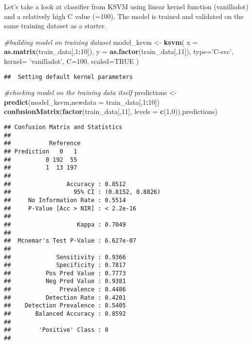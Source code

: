 \documentclass[
]{article}
\newenvironment{Shaded}{\begin{snugshade}}{\end{snugshade}}
\newcommand{\CommentTok}[1]{\textcolor[rgb]{0.56,0.35,0.01}{\textit{#1}}}
\newcommand{\DataTypeTok}[1]{\textcolor[rgb]{0.13,0.29,0.53}{#1}}
\newcommand{\DecValTok}[1]{\textcolor[rgb]{0.00,0.00,0.81}{#1}}
\newcommand{\KeywordTok}[1]{\textcolor[rgb]{0.13,0.29,0.53}{\textbf{#1}}}
\newcommand{\NormalTok}[1]{#1}
\newcommand{\OperatorTok}[1]{\textcolor[rgb]{0.81,0.36,0.00}{\textbf{#1}}}
\newcommand{\OtherTok}[1]{\textcolor[rgb]{0.56,0.35,0.01}{#1}}
\newcommand{\StringTok}[1]{\textcolor[rgb]{0.31,0.60,0.02}{#1}}
\begin{document}
Let's take a look at classifier from KSVM using linear kernel function
(vanilladot) and a relatively high C value (=100). The model is trained
and validated on the same training dataset as a starter.

\begin{Shaded}
\begin{Highlighting}[]
\CommentTok{#building model on training dataset}
\NormalTok{model_ksvm <-}\StringTok{ }\KeywordTok{ksvm}\NormalTok{( }\DataTypeTok{x =} \KeywordTok{as.matrix}\NormalTok{(train_data[,}\DecValTok{1}\OperatorTok{:}\DecValTok{10}\NormalTok{]),}
                    \DataTypeTok{y =} \KeywordTok{as.factor}\NormalTok{(train_data[,}\DecValTok{11}\NormalTok{]),}
                    \DataTypeTok{type=}\StringTok{'C-svc'}\NormalTok{,}
                    \DataTypeTok{kernel=} \StringTok{'vanilladot'}\NormalTok{,}
                    \DataTypeTok{C=}\DecValTok{100}\NormalTok{, }\DataTypeTok{scaled=}\OtherTok{TRUE}
\NormalTok{                    )}
\end{Highlighting}
\end{Shaded}

\begin{verbatim}
##  Setting default kernel parameters
\end{verbatim}

\begin{Shaded}
\begin{Highlighting}[]
\CommentTok{#checking model on the training data itself}
\NormalTok{predictions <-}\StringTok{ }\KeywordTok{predict}\NormalTok{(model_ksvm,}\DataTypeTok{newdata =}\NormalTok{ train_data[,}\DecValTok{1}\OperatorTok{:}\DecValTok{10}\NormalTok{])}
\KeywordTok{confusionMatrix}\NormalTok{(}\KeywordTok{factor}\NormalTok{(train_data[,}\DecValTok{11}\NormalTok{], }\DataTypeTok{levels =} \KeywordTok{c}\NormalTok{(}\DecValTok{1}\NormalTok{,}\DecValTok{0}\NormalTok{)),predictions)}
\end{Highlighting}
\end{Shaded}

\begin{verbatim}
## Confusion Matrix and Statistics
## 
##           Reference
## Prediction   0   1
##          0 192  55
##          1  13 197
##                                           
##                Accuracy : 0.8512          
##                  95% CI : (0.8152, 0.8826)
##     No Information Rate : 0.5514          
##     P-Value [Acc > NIR] : < 2.2e-16       
##                                           
##                   Kappa : 0.7049          
##                                           
##  Mcnemar's Test P-Value : 6.627e-07       
##                                           
##             Sensitivity : 0.9366          
##             Specificity : 0.7817          
##          Pos Pred Value : 0.7773          
##          Neg Pred Value : 0.9381          
##              Prevalence : 0.4486          
##          Detection Rate : 0.4201          
##    Detection Prevalence : 0.5405          
##       Balanced Accuracy : 0.8592          
##                                           
##        'Positive' Class : 0               
## 
\end{verbatim}
\end{document}
